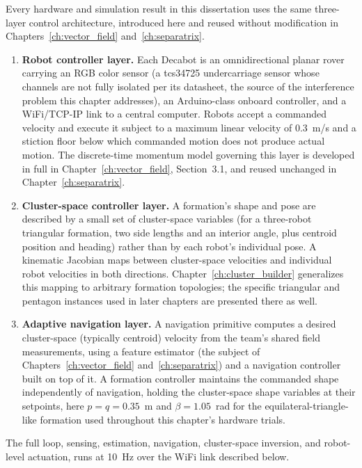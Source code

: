 \documentclass[12pt, letterpaper, oneside]{report}
\begin{document}
Every hardware and simulation result in this dissertation uses the same
three-layer control architecture, introduced here and reused without
modification in Chapters~\ref{ch:vector_field} and~\ref{ch:separatrix}.

\begin{enumerate}
\item \textbf{Robot controller layer.} Each Decabot is an omnidirectional
  planar rover carrying an RGB color sensor (a tcs34725 undercarriage sensor
  whose channels are not fully isolated per its datasheet, the source of the
  interference problem this chapter addresses), an Arduino-class onboard
  controller, and a WiFi/TCP-IP link to a central computer. Robots accept a
  commanded velocity and execute it subject to a maximum linear velocity of
  0.3~m/s and a stiction floor below which commanded motion does not produce
  actual motion. The discrete-time momentum model governing this layer is
  developed in full in Chapter~\ref{ch:vector_field}, Section~3.1, and reused
  unchanged in Chapter~\ref{ch:separatrix}.
\item \textbf{Cluster-space controller layer.} A formation's shape and pose
  are described by a small set of cluster-space variables (for a three-robot
  triangular formation, two side lengths and an interior angle, plus
  centroid position and heading) rather than by each robot's individual
  pose. A kinematic Jacobian maps between cluster-space velocities and
  individual robot velocities in both directions. Chapter~\ref{ch:cluster_builder}
  generalizes this mapping to arbitrary formation topologies; the specific
  triangular and pentagon instances used in later chapters are presented
  there as well.
\item \textbf{Adaptive navigation layer.} A navigation primitive computes a
  desired cluster-space (typically centroid) velocity from the team's shared
  field measurements, using a feature estimator (the subject of
  Chapters~\ref{ch:vector_field} and~\ref{ch:separatrix}) and a navigation
  controller built on top of it. A formation controller maintains the
  commanded shape independently of navigation, holding the cluster-space
  shape variables at their setpoints, here $p=q=0.35$~m and $\beta=1.05$~rad
  for the equilateral-triangle-like formation used throughout this chapter's
  hardware trials.
\end{enumerate}

The full loop, sensing, estimation, navigation, cluster-space inversion, and
robot-level actuation, runs at 10~Hz over the WiFi link described below.
\end{document}
